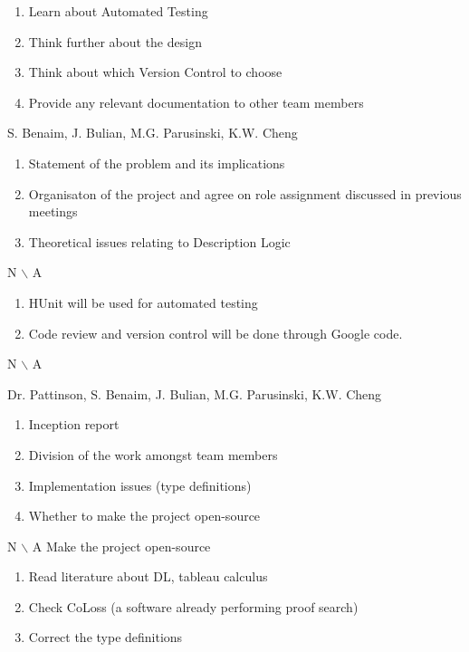 { \begin{enumerate}\item Learn about Automated Testing
\item Think further about the design
\item Think about which Version Control to choose
\item Provide any relevant documentation to other team members
\end{enumerate}}

%
{S. Benaim, J. Bulian, M.G. Parusinski, K.W. Cheng}%
{ \begin{enumerate} \item Statement of the problem and its implications 
 \item Organisaton of the project and agree on role assignment discussed in 
previous meetings
\item Theoretical issues relating to Description Logic
\end{enumerate} }%
{ N $\backslash$ A}%
{ \begin{enumerate}
\item HUnit will be used for automated testing
\item Code review and version control will be done through Google code. 
\end{enumerate}}%
{N $\backslash$ A}

%
{Dr. Pattinson, S. Benaim, J. Bulian, M.G. Parusinski, K.W. Cheng}%
{ \begin{enumerate} \item Inception report
\item Division of the work amongst team members
\item Implementation issues (type definitions)
\item Whether to make the project open-source
\end{enumerate} }%
{ N $\backslash$ A}%
{Make the project open-source}
{ \begin{enumerate}
\item Read literature about DL, tableau calculus
\item Check CoLoss (a software already performing proof search)
\item Correct the type definitions 
\end{enumerate}}%


